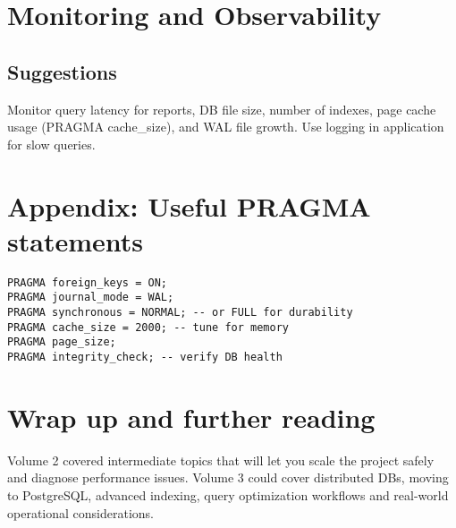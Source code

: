 \documentclass[11pt,a4paper]{article}
\begin{document}
\section{Monitoring and Observability}
\subsection{Suggestions}
Monitor query latency for reports, DB file size, number of indexes, page cache usage (PRAGMA cache_size), and WAL file growth. Use logging in application for slow queries.

\section*{Appendix: Useful PRAGMA statements}
\begin{lstlisting}
PRAGMA foreign_keys = ON;
PRAGMA journal_mode = WAL;
PRAGMA synchronous = NORMAL; -- or FULL for durability
PRAGMA cache_size = 2000; -- tune for memory
PRAGMA page_size;
PRAGMA integrity_check; -- verify DB health
\end{lstlisting}

\section*{Wrap up and further reading}
Volume 2 covered intermediate topics that will let you scale the project safely and diagnose performance issues. Volume 3 could cover distributed DBs, moving to PostgreSQL, advanced indexing, query optimization workflows and real-world operational considerations.
\end{document}
